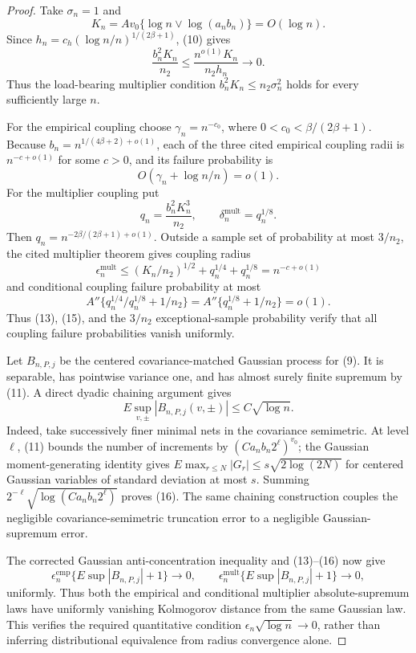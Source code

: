 \documentclass{article}
\begin{document}
\begin{proof}
Take \(\sigma_n=1\) and
\[
 K_n=Av_0\{\log n\vee\log(a_nb_n)\}=O(\log n).
\]
Since \(h_n=c_h(\log n/n)^{1/(2\beta+1)}\), (10) gives
\[
 \frac{b_n^2K_n}{n_2}
 \le\frac{n^{o(1)}K_n}{n_2h_n}\longrightarrow0. \tag{12}
\]
Thus the load-bearing multiplier condition \(b_n^2K_n\le n_2\sigma_n^2\) holds for every sufficiently large \(n\).

For the empirical coupling choose \(\gamma_n=n^{-c_0}\), where
\(0<c_0<\beta/(2\beta+1)\).  Because
\(b_n=n^{1/(4\beta+2)+o(1)}\), each of the three cited empirical coupling radii is \(n^{-c+o(1)}\) for some \(c>0\), and its failure probability is
\[
 O(\gamma_n+\log n/n)=o(1). \tag{13}
\]
For the multiplier coupling put
\[
 q_n=\frac{b_n^2K_n^3}{n_2},
 \qquad \delta_n^{\mathrm{mult}}=q_n^{1/8}.
\]
Then \(q_n=n^{-2\beta/(2\beta+1)+o(1)}\).  Outside a sample set of probability at most \(3/n_2\), the cited multiplier theorem gives coupling radius
\[
 \epsilon_n^{\mathrm{mult}}
 \le (K_n/n_2)^{1/2}+q_n^{1/4}+q_n^{1/8}
 =n^{-c+o(1)} \tag{14}
\]
and conditional coupling failure probability at most
\[
 A''\{q_n^{1/4}/q_n^{1/8}+1/n_2\}
 =A''\{q_n^{1/8}+1/n_2\}=o(1). \tag{15}
\]
Thus (13), (15), and the \(3/n_2\) exceptional-sample probability verify that all coupling failure probabilities vanish uniformly.

Let \(B_{n,P,j}\) be the centered covariance-matched Gaussian process for (9).  It is separable, has pointwise variance one, and has almost surely finite supremum by (11).  A direct dyadic chaining argument gives
\[
 E\sup_{v,\pm}|B_{n,P,j}(v,\pm)|\le C\sqrt{\log n}. \tag{16}
\]
Indeed, take successively finer minimal nets in the covariance semimetric.  At level \(\ell\), (11) bounds the number of increments by \((Ca_nb_n2^\ell)^{v_0}\); the Gaussian moment-generating identity gives
\(E\max_{r\le N}|G_r|\le s\sqrt{2\log(2N)}\) for centered Gaussian variables of standard deviation at most \(s\).  Summing
\(2^{-\ell}\sqrt{\log(Ca_nb_n2^\ell)}\) proves (16).  The same chaining construction couples the negligible covariance-semimetric truncation error to a negligible Gaussian-supremum error.

The corrected Gaussian anti-concentration inequality and (13)--(16) now give
\[
 \epsilon_n^{\mathrm{emp}}\{E\sup|B_{n,P,j}|+1\}\to0,
 \qquad
 \epsilon_n^{\mathrm{mult}}\{E\sup|B_{n,P,j}|+1\}\to0, \tag{17}
\]
uniformly.  Thus both the empirical and conditional multiplier absolute-supremum laws have uniformly vanishing Kolmogorov distance from the same Gaussian law.  This verifies the required quantitative condition \(\epsilon_n\sqrt{\log n}\to0\), rather than inferring distributional equivalence from radius convergence alone.


\end{proof}
\end{document}
